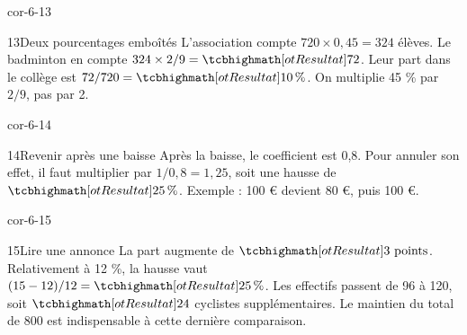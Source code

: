 \begin{blocLivre}{cor-6-13}\begin{corrige}{13}{Deux pourcentages emboîtés}
L’association compte $720\times0{,}45=324$ élèves. Le badminton en compte $324\times2/9=\res{72}$. Leur part dans le collège est $72/720=\res{10\,\%}$. On multiplie 45 \% par $2/9$, pas par 2.
\end{corrige}\end{blocLivre}
\begin{blocLivre}{cor-6-14}\begin{corrige}{14}{Revenir après une baisse}
Après la baisse, le coefficient est 0,8. Pour annuler son effet, il faut multiplier par $1/0{,}8=1{,}25$, soit une hausse de $\res{25\,\%}$. Exemple : 100 € devient 80 €, puis 100 €.
\end{corrige}\end{blocLivre}
\begin{blocLivre}{cor-6-15}\begin{corrige}{15}{Lire une annonce}
La part augmente de $\res{3\text{ points}}$. Relativement à 12 \%, la hausse vaut $(15-12)/12=\res{25\,\%}$. Les effectifs passent de 96 à 120, soit $\res{24}$ cyclistes supplémentaires. Le maintien du total de 800 est indispensable à cette dernière comparaison.
\end{corrige}\end{blocLivre}
